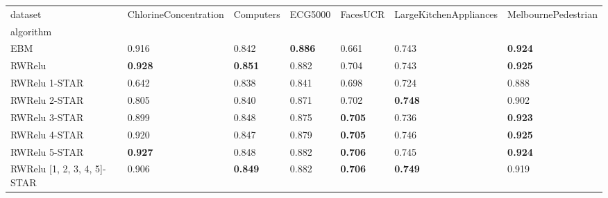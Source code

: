 \begin{tabular}{lllllll}
\toprule
dataset & ChlorineConcentration & Computers & ECG5000 & FacesUCR & LargeKitchenAppliances & MelbournePedestrian \\
algorithm &  &  &  &  &  &  \\
\midrule
EBM & 0.916 & 0.842 & \textbf{0.886} & 0.661 & 0.743 & \textbf{0.924} \\
RWRelu & \textbf{0.928} & \textbf{0.851} & 0.882 & 0.704 & 0.743 & \textbf{0.925} \\
RWRelu 1-STAR & 0.642 & 0.838 & 0.841 & 0.698 & 0.724 & 0.888 \\
RWRelu 2-STAR & 0.805 & 0.840 & 0.871 & 0.702 & \textbf{0.748} & 0.902 \\
RWRelu 3-STAR & 0.899 & 0.848 & 0.875 & \textbf{0.705} & 0.736 & \textbf{0.923} \\
RWRelu 4-STAR & 0.920 & 0.847 & 0.879 & \textbf{0.705} & 0.746 & \textbf{0.925} \\
RWRelu 5-STAR & \textbf{0.927} & 0.848 & 0.882 & \textbf{0.706} & 0.745 & \textbf{0.924} \\
RWRelu [1, 2, 3, 4, 5]-STAR & 0.906 & \textbf{0.849} & 0.882 & \textbf{0.706} & \textbf{0.749} & 0.919 \\
\bottomrule
\end{tabular}
